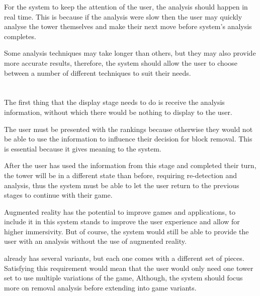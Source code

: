 \begin{enumerate}
For the system to keep the attention of the user, the analysis should happen in real time. This is because if the analysis were slow then the user may quickly analyse the tower themselves and make their next move before system's analysis completes.

Some analysis techniques may take longer than others, but they may also provide more accurate results, therefore, the system should allow the user to choose between a number of different techniques to suit their needs.

\section{\display}

The first thing that the display stage needs to do is receive the analysis information, without which there would be nothing to display to the user.

The user must be presented with the rankings because otherwise they would not be able to use the information to influence their decision for block removal. This is essential because it gives meaning to the system.

After the user has used the information from this stage and completed their turn, the tower will be in a different state than before, requiring re-detection and analysis, thus the system must be able to let the user return to the previous stages to continue with their game.

Augmented reality has the potential to improve games and applications, to include it in this system stands to improve the user experience and allow for higher immersivity. But of course, the system would still be able to provide the user with an analysis without the use of augmented reality.

\jenga{} already has several variants, but each one comes with a different set of pieces. Satisfying this requirement would mean that the user would only need one tower set to use multiple variations of the game, Although, the system should focus more on removal analysis before extending into game variants.


\end{enumerate}
